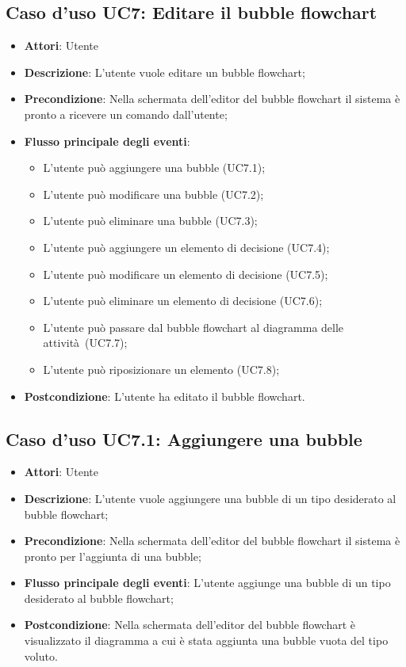 \documentclass[../AnalisiDeiRequisiti.tex]{subfiles}
\begin{document}
				\subsection{Caso d'uso UC7: Editare il bubble flowchart}
				\begin{itemize}
					\item \textbf{Attori}: Utente
					\item \textbf{Descrizione}: L'utente vuole editare un bubble flowchart;
					\item \textbf{Precondizione}: Nella schermata dell'editor del bubble flowchart il sistema è pronto a ricevere un comando dall'utente;
					\item \textbf{Flusso principale degli eventi}: \begin{itemize}
						\item L'utente può aggiungere una bubble (UC7.1);
						\item L'utente può modificare una bubble (UC7.2);
						\item L'utente può eliminare una bubble (UC7.3);
						\item L'utente può aggiungere un elemento di decisione (UC7.4);
						\item L'utente può modificare un elemento di decisione (UC7.5);
						\item L'utente può eliminare un elemento di decisione (UC7.6);
						\item L'utente può passare dal bubble flowchart al diagramma delle attività (UC7.7);
						\item L'utente può riposizionare un elemento (UC7.8);
					\end{itemize}
					\item \textbf{Postcondizione}: L'utente ha editato il bubble flowchart.
				\end{itemize}
				\subsection{Caso d'uso UC7.1: Aggiungere una bubble}
				\begin{itemize}
					\item \textbf{Attori}: Utente
					\item \textbf{Descrizione}: L'utente vuole aggiungere una bubble di un tipo desiderato al bubble flowchart;
					\item \textbf{Precondizione}: Nella schermata dell'editor del bubble flowchart il sistema è pronto per l'aggiunta di una bubble;
					\item \textbf{Flusso principale degli eventi}: L'utente aggiunge una bubble di un tipo desiderato al bubble flowchart;
					\item \textbf{Postcondizione}: Nella schermata dell'editor del bubble flowchart è visualizzato il diagramma a cui è stata aggiunta una bubble vuota del tipo voluto.
				\end{itemize}
\end{document}

